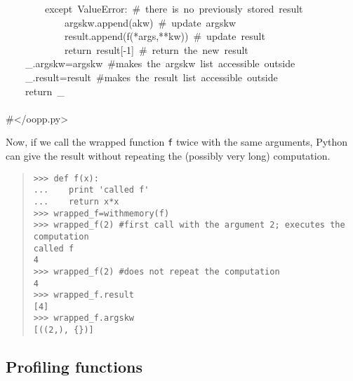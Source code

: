 \documentclass[10pt,english]{article}
\begin{document}
\begin{ttfamily}
\begin{flushleft}
\mbox{~~~~~~~~except~ValueError:~{\#}~there~is~no~previously~stored~result}\\
\mbox{~~~~~~~~~~~~argskw.append(akw)~{\#}~update~argskw}\\
\mbox{~~~~~~~~~~~~result.append(f(*args,**kw))~{\#}~update~result}\\
\mbox{~~~~~~~~~~~~return~result[-1]~{\#}~return~the~new~result}\\
\mbox{~~~~{\_}.argskw=argskw~{\#}makes~the~argskw~list~accessible~outside}\\
\mbox{~~~~{\_}.result=result~{\#}makes~the~result~list~accessible~outside}\\
\mbox{~~~~return~{\_}}\\
\mbox{}\\
\mbox{{\#}</oopp.py>}
\end{flushleft}\end{ttfamily}

Now, if we call the wrapped function \texttt{f}  twice with the same arguments, 
Python can give the result without repeating the (possibly very long) 
computation.
\begin{quote}
\begin{verbatim}>>> def f(x):
...    print 'called f'
...    return x*x
>>> wrapped_f=withmemory(f)
>>> wrapped_f(2) #first call with the argument 2; executes the computation
called f
4
>>> wrapped_f(2) #does not repeat the computation
4
>>> wrapped_f.result
[4]
>>> wrapped_f.argskw
[((2,), {})]\end{verbatim}
\end{quote}



\hypertarget{profiling-functions}{}
\subsection*{Profiling functions}
\end{document}

